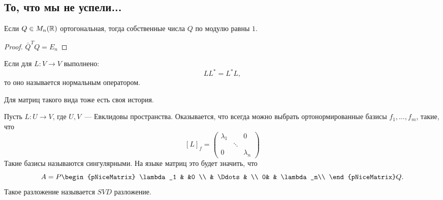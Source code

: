 \subsection{То, что мы не успели...}
\begin{theorem}
    Если $Q \in M_n(\mathbb{R})$ ортогональная, тогда собственные числа $Q$ по
    модулю равны $1$.
\end{theorem}
\begin{proof}
    $\bar{Q}^T Q= E_n$
\end{proof}

\begin{definition}
    Если для $L\colon V \to V$ выполнено:
    \[
    L L^* = L^* L
    ,\] то оно называется нормальным оператором.
\end{definition}
Для матриц такого вида тоже есть своя история.

Пусть $L\colon U \to V$, где $U, V$~--- Евклидовы пространства.
Оказывается, что всегда можно выбрать ортонормированные базисы  $f_1,\dots, f_m$,
такие, что
\[
    [L]_f = 
    \begin{pmatrix}
        \lambda_1 & & 0\\
        & \ddots & \\
        0 & & \lambda_n
    \end{pmatrix}
\] 
Такие базисы называются сингулярными.
На языке матриц это будет значить, что
\[
    A = P 
    \begin{pNiceMatrix}
        \lambda_1 & &0 \\
          & \Ddots & \\
        0& & \lambda_n\\
    \end{pNiceMatrix} Q
.\]
Такое разложение называется $SVD$ разложение.
